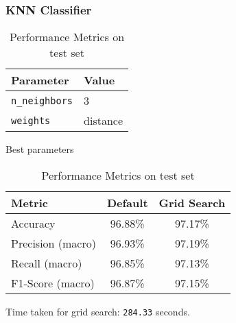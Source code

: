 \subsubsection{KNN Classifier}
\begin{table}[h!]
  \begin{minipage}{.5\linewidth}
    \centering
    \begin{tabular}{|l|l|}
      \hline
      \textbf{Parameter} & \textbf{Value} \\
      \hline
      \texttt{n\_neighbors} & 3 \\
      \texttt{weights} & distance \\
      \hline
    \end{tabular}
    \caption{Best parameters}
  \end{minipage}%
  \begin{minipage}{.5\linewidth}
    \centering
    \begin{tabular}{|l|c|c|}
      \hline
      \textbf{Metric} & \textbf{Default} & \textbf{Grid Search} \\
      \hline
      Accuracy & 96.88\% & 97.17\% \\
      Precision (macro) & 96.93\% & 97.19\% \\
      Recall (macro) & 96.85\% & 97.13\% \\
      F1-Score (macro) & 96.87\% & 97.15\% \\
      \hline
    \end{tabular}
    \caption{Performance Metrics on test set}
  \end{minipage}
\end{table}


Time taken for grid search: \texttt{284.33} seconds.

